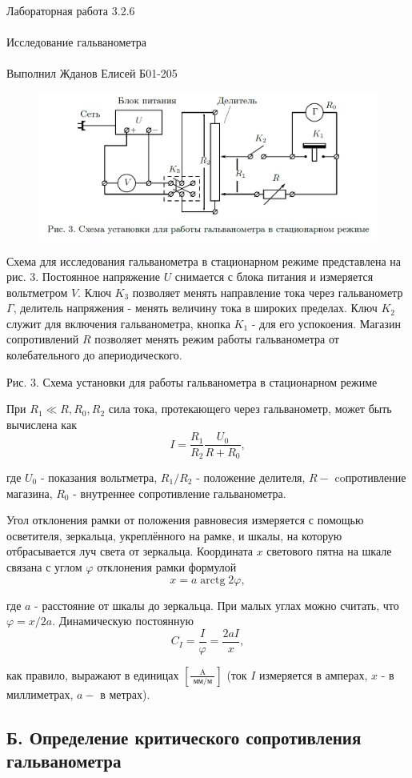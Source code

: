 \documentclass{astroedu-lab}
\begin{document}
\begin{problem}{\huge Лабораторная работа 3.2.6\\\\Исследование гальванометра\\\\Выполнил Жданов Елисей Б01-205}
\begin{figure}[!h]
	\centering
	\includegraphics[width=1\textwidth]{уст1.png}
	\label{fig:boiler}
\end{figure}

Схема для исследования гальванометра в стационарном режиме представлена на рис. 3. Постоянное напряжение $U$ снимается с блока питания и измеряется вольтметром $V$. Ключ $K_3$ позволяет менять направление тока через гальванометр $\Gamma$, делитель напряжения - менять величину тока в широких пределах. Ключ $K_2$ служит для включения гальванометра, кнопка $K_1$ - для его успокоения. Магазин сопротивлений $R$ позволяет менять режим работы гальванометра от колебательного до апериодического.

Рис. 3. Схема установки для работы гальванометра в стационарном режиме

При $R_1 \ll R, R_0, R_2$ сила тока, протекающего через гальванометр, может быть вычислена как
$$
I=\frac{R_1}{R_2} \frac{U_0}{R+R_0},
$$

где $U_0$ - показания вольтметра, $R_1 / R_2$ - положение делителя, $R-$ coпротивление магазина, $R_0$ - внутреннее сопротивление гальванометра.

Угол отклонения рамки от положения равновесия измеряется с помощью осветителя, зеркальца, укреплённого на рамке, и шкалы, на которую отбрасывается луч света от зеркальца. Координата $x$ светового пятна на шкале связана с углом $\varphi$ отклонения рамки формулой
$$
x=a \operatorname{arctg} 2 \varphi,
$$

где $a$ - расстояние от шкалы до зеркальца. При малых углах можно считать, что $\varphi=x / 2 a$. Динамическую постоянную
$$
C_I=\frac{I}{\varphi}=\frac{2 a I}{x},
$$

как правило, выражают в единицах $\left[\frac{\mathrm{A}}{\text { мм/м }}\right]$ (ток $I$ измеряется в амперах, $x$ - в миллиметрах, $a-$ в метрах).

\subsection{Б. Определение критического сопротивления гальванометра}


\end{problem}
\end{document}
